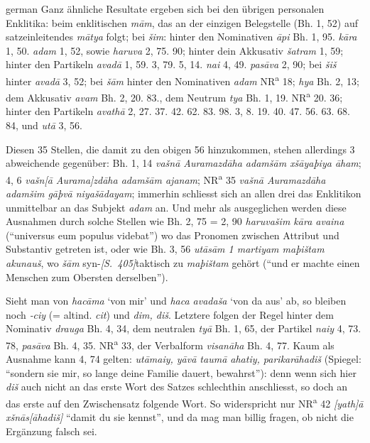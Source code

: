\begin{otherlanguage*}{german}
Ganz ähnliche Resultate ergeben sich bei den übrigen personalen Enklitika: beim enklitischen \emph{mām}, das an der einzigen Belegstelle (Bh. 1, 52) auf satzeinleitendes \emph{mātya} folgt; bei \emph{šim}: hinter den Nominativen \emph{āpi} Bh. 1, 95. \emph{kāra} 1, 50. \emph{adam} 1, 52, sowie \emph{haruva} 2, 75. 90; hinter dein Akkusativ \emph{šatram} 1, 59; hinter den Partikeln \emph{avadā} 1, 59. 3, 79. 5, 14. \emph{nai} 4, 49. \emph{pasāva} 2, 90; bei \emph{šiš} hinter \emph{avadā} 3, 52; bei \emph{šām} hinter den Nominativen \emph{adam} NR\textsuperscript{a} 18; \emph{hya} Bh. 2, 13; dem Akkusativ \emph{avam} Bh. 2, 20. 83., dem Neutrum \emph{tya} Bh. 1, 19. NR\textsuperscript{a} 20. 36; hinter den Partikeln \emph{avathā} 2, 27. 37. 42. 62. 83. 98. 3, 8. 19. 40. 47. 56. 63. 68. 84, und \emph{utā} 3, 56.

Diesen 35 Stellen, die damit zu den obigen 56 hinzukommen, stehen allerdings 3 abweichende gegenüber: Bh. 1, 14 \emph{vašnā Auramazdāha adamšām xšāyaþiya āham}; 4, 6 \emph{vašn[ā Aurama]zdāha adamšām ajanam}; NR\textsuperscript{a} 35 \emph{vašnā Auramazdāha adamšim gāþvā niyašādayam}; immerhin schliesst sich an allen drei das Enklitikon unmittelbar an das Subjekt \emph{adam} an. Und mehr als ausgeglichen werden diese Ausnahmen durch solche Stellen wie Bh. 2, 75 = 2, 90 \emph{haruvašim kāra avaina} (“universus eum populus videbat”) wo das Pronomen zwischen Attribut und Substantiv getreten ist, oder wie Bh. 3, 56 \emph{utāsām 1 martiyam maþištam akunauš}, wo \emph{šām} syn-\hypertarget{p405}{\emph{[S.~405]}}\label{p405}taktisch zu \emph{maþištam} gehört (“und er machte einen Menschen zum Obersten derselben”).

Sieht man von \emph{hacāma} ‘von mir’ und \emph{haca avadaša} ‘von da aus’ ab, so bleiben noch \emph{‑ciy} (= altind. \emph{cit}) und \emph{dim, diš}. Letztere folgen der Regel hinter dem Nominativ \emph{drauga} Bh. 4, 34, dem neutralen \emph{tyā} Bh. 1, 65, der Partikel \emph{naiy} 4, 73. 78, \emph{pasāva} Bh. 4, 35. NR\textsuperscript{a} 33, der Verbalform \emph{visanāha} Bh. 4, 77. Kaum als Ausnahme kann 4, 74 gelten: \emph{utāmaiy, yāvā taumā ahatiy, parikarāhadiš} (Spiegel: “sondern sie mir, so lange deine Familie dauert, bewahrst”): denn wenn sich hier \emph{diš} auch nicht an das erste Wort des Satzes schlechthin anschliesst, so doch an das erste auf den Zwischensatz folgende Wort. So widerspricht nur NR\textsuperscript{a} 42 \emph{[yath]ā xšnās[āhadiš]} “damit du sie kennst”, und da mag man billig fragen, ob nicht die Ergänzung falsch sei.


\end{otherlanguage*}
